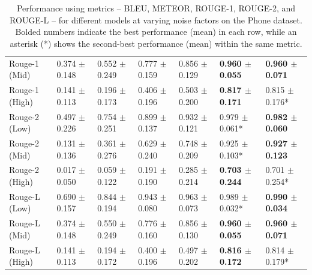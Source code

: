 \begin{table}[htbp]
\begin{tabular}{l|p{2cm}p{2cm}p{2cm}p{2cm}p{2cm}p{2cm}}
        Rouge-1 (Mid) & 0.374 $\pm$ 0.148 & 0.552 $\pm$ 0.249 & 0.777 $\pm$ 0.159 & 0.856 $\pm$ 0.129 & \textbf{0.960 $\pm$ 0.055} & \textbf{0.960 $\pm$ 0.071} \\
        Rouge-1 (High) & 0.141 $\pm$ 0.113 & 0.196 $\pm$ 0.173 & 0.406 $\pm$ 0.196 & 0.503 $\pm$ 0.200 & \textbf{0.817 $\pm$ 0.171} & 0.815 $\pm$ 0.176* \\
        \midrule
        Rouge-2 (Low) & 0.497 $\pm$ 0.226 & 0.754 $\pm$ 0.251 & 0.899 $\pm$ 0.137 & 0.932 $\pm$ 0.121 & 0.979 $\pm$ 0.061* & \textbf{0.982 $\pm$ 0.060} \\
        Rouge-2 (Mid) & 0.131 $\pm$ 0.136 & 0.361 $\pm$ 0.276 & 0.629 $\pm$ 0.240 & 0.748 $\pm$ 0.209 & 0.925 $\pm$ 0.103* & \textbf{0.927 $\pm$ 0.123} \\
        Rouge-2 (High) & 0.017 $\pm$ 0.050 & 0.059 $\pm$ 0.122 & 0.191 $\pm$ 0.190 & 0.285 $\pm$ 0.214 & \textbf{0.703 $\pm$ 0.244} & 0.701 $\pm$ 0.254* \\
        \midrule
        Rouge-L (Low) & 0.690 $\pm$ 0.157 & 0.844 $\pm$ 0.194 & 0.943 $\pm$ 0.080 & 0.963 $\pm$ 0.073 & 0.989 $\pm$ 0.032* & \textbf{0.990 $\pm$ 0.034} \\
        Rouge-L (Mid) & 0.374 $\pm$ 0.148 & 0.550 $\pm$ 0.249 & 0.776 $\pm$ 0.160 & 0.856 $\pm$ 0.130 & \textbf{0.960 $\pm$ 0.055} & \textbf{0.960 $\pm$ 0.071} \\
        Rouge-L (High) & 0.141 $\pm$ 0.113 & 0.194 $\pm$ 0.172 & 0.400 $\pm$ 0.196 & 0.497 $\pm$ 0.202 & \textbf{0.816 $\pm$ 0.172} & 0.814 $\pm$ 0.179* \\
        \bottomrule
    \end{tabular}
    \vspace{0.2em}
    \caption{Performance using metrics -- BLEU, METEOR, ROUGE-1, ROUGE-2, and ROUGE-L -- for different models at varying noise factors on the Phone dataset. Bolded numbers indicate the best performance (mean) in each row, while an asterisk (*) shows the second-best performance (mean) within the same metric.}
    \label{tab:metrics_noise_levels_phone}
\end{table}

